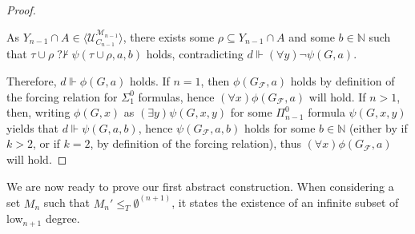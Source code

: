 \documentclass{article}
\def\NN{\mathbb{N}}
\def\F{\mathcal{F}}
\def\U{\mathcal{U}}
\def\M{\mathcal{M}}
\newcommand{\ludovic}[1]{\textcolor{blue}{#1}}
\newcommand{\nqvdash}{\operatorname{{?}{\nvdash}}}
\numberwithin{theorem}{section}
\newtheorem{proposition}[theorem]{Proposition}
\theoremstyle{definition}
\begin{document}
\begin{proof}
\begin{itemize}
    As $Y_{n-1} \cap A \in \langle \U_{C_{n-1}}^{\M_{n-1}} \rangle$, there exists some $\rho \subseteq Y_{n-1} \cap A$ and some $b \in \NN$ such that $\tau \cup \rho \nqvdash \psi(\tau \cup \rho, a,b)$ holds, contradicting $d \Vdash (\forall y) \neg \psi(G,a)$. %
\end{itemize}

Therefore, $d \Vdash \phi(G,a)$ holds. If $n = 1$, then $\phi(G_{\F},a)$ holds by definition of the forcing relation for $\Sigma_1^0$ formulas, hence $(\forall x)\phi(G_{\F},a)$ will hold. If $n > 1$, then, writing $\phi(G,x)$ as $(\exists y)\psi(G,x,y)$ for some $\Pi_{n-1}^0$ formula $\psi(G,x,y)$ yields that $d \Vdash \psi(G,a,b)$, hence $\psi(G_{\F},a,b)$ holds for some $b \in \NN$ (either by  if $k > 2$, or if $k = 2$, by definition of the forcing relation), thus $(\forall x)\phi(G_{\F},a)$ will hold. 
\end{proof}

We are now ready to prove our first abstract construction. When considering a set $M_n$ such that $M_n' \leq_T \emptyset^{(n+1)}$, it states the existence of an infinite subset of low${}_{n+1}$ degree.

\end{document}

